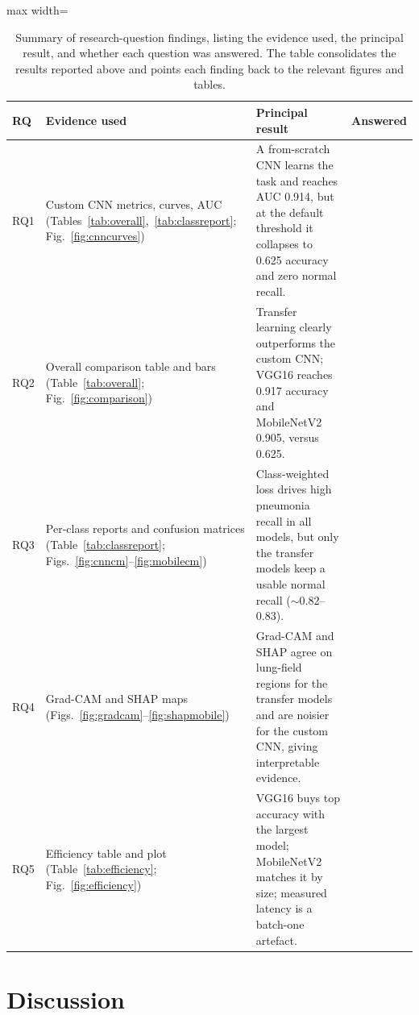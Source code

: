 \documentclass[preprint,12pt]{elsarticle}
\newcommand{\cmark}{\ding{51}} %
\begin{document}
\begin{table}[!ht]
\centering
\caption{Summary of research-question findings, listing the evidence used, the principal result, and whether each question was answered. The table consolidates the results reported above and points each finding back to the relevant figures and tables.}
\label{tab:rqsummary}
\begin{adjustbox}{max width=\textwidth}
\begin{tabular}{p{0.8cm} p{5.2cm} p{7.4cm} p{1.6cm}}
\toprule
\textbf{RQ} & \textbf{Evidence used} & \textbf{Principal result} & \textbf{Answered} \\
\midrule
RQ1 & Custom CNN metrics, curves, AUC (Tables~\ref{tab:overall},~\ref{tab:classreport}; Fig.~\ref{fig:cnncurves}) & A from-scratch CNN learns the task and reaches AUC 0.914, but at the default threshold it collapses to 0.625 accuracy and zero normal recall. & \cmark \\
RQ2 & Overall comparison table and bars (Table~\ref{tab:overall}; Fig.~\ref{fig:comparison}) & Transfer learning clearly outperforms the custom CNN; VGG16 reaches 0.917 accuracy and MobileNetV2 0.905, versus 0.625. & \cmark \\
RQ3 & Per-class reports and confusion matrices (Table~\ref{tab:classreport}; Figs.~\ref{fig:cnncm}--\ref{fig:mobilecm}) & Class-weighted loss drives high pneumonia recall in all models, but only the transfer models keep a usable normal recall ($\sim$0.82--0.83). & \cmark \\
RQ4 & Grad-CAM and SHAP maps (Figs.~\ref{fig:gradcam}--\ref{fig:shapmobile}) & Grad-CAM and SHAP agree on lung-field regions for the transfer models and are noisier for the custom CNN, giving interpretable evidence. & \cmark \\
RQ5 & Efficiency table and plot (Table~\ref{tab:efficiency}; Fig.~\ref{fig:efficiency}) & VGG16 buys top accuracy with the largest model; MobileNetV2 matches it by size; measured latency is a batch-one artefact. & \cmark \\
\bottomrule
\end{tabular}
\end{adjustbox}
\end{table}

\section{Discussion}
\end{document}
